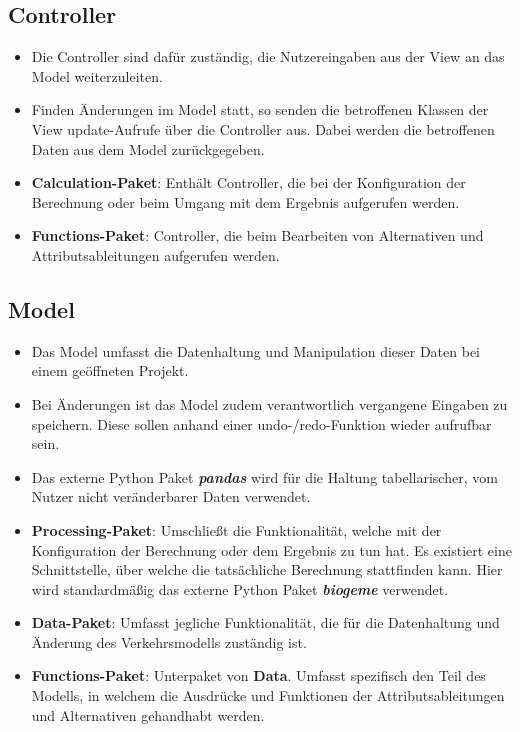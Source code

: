\documentclass{article}
\begin{document}
\subsection{Controller}
\begin{itemize}
\item Die Controller sind dafür zuständig, die Nutzereingaben aus der View an das Model weiterzuleiten.
\item Finden Änderungen im Model statt, so senden die betroffenen Klassen der View update-Aufrufe über die Controller aus. Dabei werden die betroffenen Daten aus dem Model zurückgegeben.
\item \textbf{Calculation-Paket}: Enthält Controller, die bei der Konfiguration der Berechnung oder beim Umgang mit dem Ergebnis aufgerufen werden.
\item \textbf{Functions-Paket}: Controller, die beim Bearbeiten von Alternativen und
Attributsableitungen aufgerufen werden.
\end{itemize}

\subsection{Model}
\begin{itemize}
\item Das Model umfasst die Datenhaltung und Manipulation dieser Daten bei einem geöffneten Projekt.
\item Bei Änderungen ist das Model zudem verantwortlich vergangene Eingaben zu speichern. Diese sollen anhand einer undo-/redo-Funktion wieder aufrufbar sein.
\item Das externe Python Paket \emph{\textbf{pandas}} wird für die Haltung tabellarischer, vom Nutzer nicht veränderbarer Daten verwendet.
\item \textbf{Processing-Paket}: Umschließt die Funktionalität, welche mit der Konfiguration der Berechnung oder dem Ergebnis zu tun hat. Es existiert eine Schnittstelle, über welche die tatsächliche Berechnung stattfinden kann. Hier wird standardmäßig das externe Python Paket \emph{\textbf{biogeme}} verwendet.
\item \textbf{Data-Paket}: Umfasst jegliche Funktionalität, die für die Datenhaltung und Änderung des Verkehrsmodells zuständig ist.
\item \textbf{Functions-Paket}: Unterpaket von \textbf{Data}. Umfasst spezifisch den Teil des Modells, in welchem die Ausdrücke und Funktionen der Attributsableitungen und Alternativen gehandhabt werden.
\end{itemize}
\end{document}
